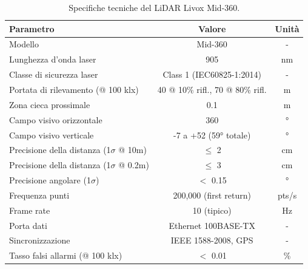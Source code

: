 \begin{table}[htbp]
    \centering
    \caption{Specifiche tecniche del LiDAR Livox Mid-360.}
    \label{tab:lidar_specs}
    \begin{tabular}{|l|c|c|}
        \hline
        \textbf{Parametro}                           & \textbf{Valore}                  & \textbf{Unità} \\
        \hline
        Modello                                      & Mid-360                          & -              \\
        Lunghezza d'onda laser                       & 905                              & nm             \\
        Classe di sicurezza laser                    & Class 1 (IEC60825-1:2014)        & -              \\
        Portata di rilevamento (@ 100 klx)           & 40 @ 10\% rifl., 70 @ 80\% rifl. & m              \\
        Zona cieca prossimale                        & 0.1                              & m              \\
        Campo visivo orizzontale                     & 360                              & °              \\
        Campo visivo verticale                       & -7 a +52 (59° totale)            & °              \\
        Precisione della distanza (1$\sigma$ @ 10m)  & $\leq$ 2                         & cm             \\
        Precisione della distanza (1$\sigma$ @ 0.2m) & $\leq$ 3                         & cm             \\
        Precisione angolare (1$\sigma$)              & $<$ 0.15                         & °              \\
        Frequenza punti                              & 200,000 (first return)           & pts/s          \\
        Frame rate                                   & 10 (tipico)                      & Hz             \\
        Porta dati                                   & Ethernet 100BASE-TX              & -              \\
        Sincronizzazione                             & IEEE 1588-2008, GPS              & -              \\
        Tasso falsi allarmi (@ 100 klx)              & $<$ 0.01                         & \%             \\

\end{tabular}
\end{table}
